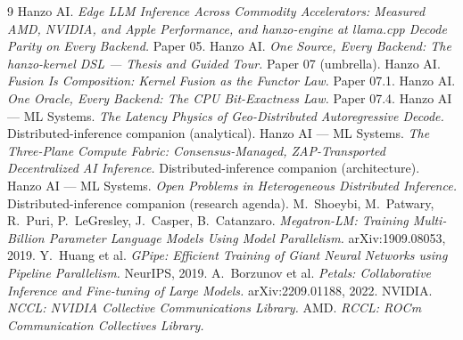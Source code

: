 \documentclass[11pt]{article}
\begin{document}
\begin{thebibliography}{9}
\small
{} Hanzo AI. \emph{Edge LLM Inference Across Commodity Accelerators: Measured AMD, NVIDIA,
and Apple Performance, and hanzo-engine at llama.cpp Decode Parity on Every Backend.} Paper 05.
 Hanzo AI. \emph{One Source, Every Backend: The hanzo-kernel DSL --- Thesis and Guided
Tour.} Paper 07 (umbrella).
 Hanzo AI. \emph{Fusion Is Composition: Kernel Fusion as the Functor Law.} Paper 07.1.
 Hanzo AI. \emph{One Oracle, Every Backend: The CPU Bit-Exactness Law.} Paper 07.4.
 Hanzo AI --- ML Systems. \emph{The Latency Physics of Geo-Distributed Autoregressive
Decode.} Distributed-inference companion (analytical).
 Hanzo AI --- ML Systems. \emph{The Three-Plane Compute Fabric: Consensus-Managed,
ZAP-Transported Decentralized AI Inference.} Distributed-inference companion (architecture).
 Hanzo AI --- ML Systems. \emph{Open Problems in Heterogeneous Distributed
Inference.} Distributed-inference companion (research agenda).
 M.\ Shoeybi, M.\ Patwary, R.\ Puri, P.\ LeGresley, J.\ Casper, B.\ Catanzaro.
\emph{Megatron-LM: Training Multi-Billion Parameter Language Models Using Model Parallelism.} arXiv:1909.08053, 2019.
 Y.\ Huang et al. \emph{GPipe: Efficient Training of Giant Neural Networks using Pipeline
Parallelism.} NeurIPS, 2019.
 A.\ Borzunov et al. \emph{Petals: Collaborative Inference and Fine-tuning of Large
Models.} arXiv:2209.01188, 2022.
 NVIDIA. \emph{NCCL: NVIDIA Collective Communications Library.}
 AMD. \emph{RCCL: ROCm Communication Collectives Library.}
\end{thebibliography}
\end{document}
